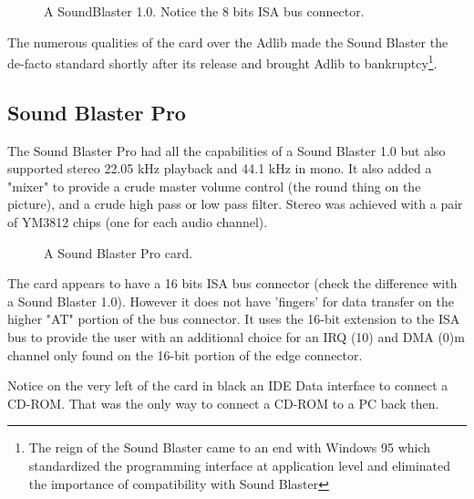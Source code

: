 \documentclass[book.tex]{subfiles}
\begin{document}
\begin{figure}[H] 
  \centering 
  \caption{A SoundBlaster 1.0. Notice the 8 bits ISA bus connector.}
\end{figure}
\par
   The numerous qualities of the card over the Adlib made the Sound Blaster the de-facto standard shortly after its release and brought Adlib to bankruptcy\footnote{The reign of the Sound Blaster came to an end with Windows 95 which standardized the programming interface at application level and eliminated the importance of compatibility with Sound Blaster}.


  \subsection{Sound Blaster Pro}
The Sound Blaster Pro had all the capabilities of a Sound Blaster 1.0 but also supported stereo 22.05 kHz playback and 44.1 kHz in mono. It also added a "mixer" to provide a crude master volume control (the round thing on the picture), and a crude high pass or low pass filter. Stereo was achieved with a pair of YM3812 chips (one for each audio channel).\\
\begin{figure}[H] 
  \centering 
  \caption{A Sound Blaster Pro card.}
\end{figure}
 The card appears to have a 16 bits ISA bus connector (check the difference with a Sound Blaster 1.0). However it does not have 'fingers' for data transfer on the higher "AT" portion of the bus connector. It uses the 16-bit extension to the ISA bus to provide the user with an additional choice for an IRQ (10) and DMA (0)m channel only found on the 16-bit portion of the edge connector.\\
\par
{} Notice on the very left of the card in black an IDE Data interface to connect a CD-ROM. That was the only way to connect a CD-ROM to a PC back then.
\end{document}
